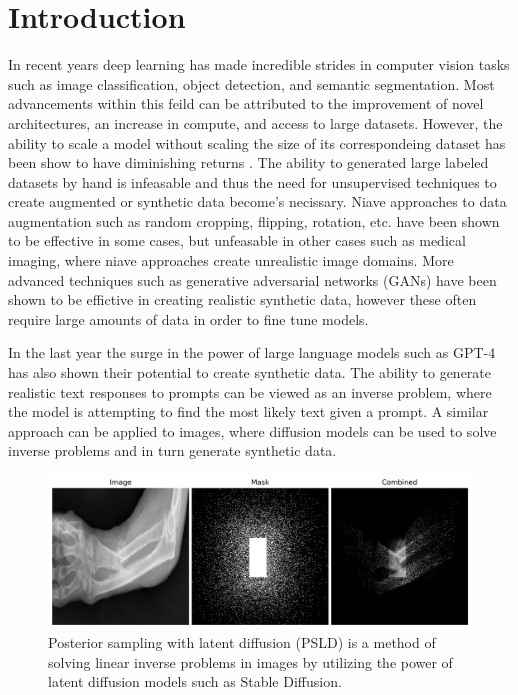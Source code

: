 \documentclass{article}
\begin{document}
\section{Introduction}
\label{introdcution}

In recent years deep learning has made incredible strides in computer vision tasks such as image classification,
object detection, and semantic segmentation. Most advancements within this feild can be attributed to the improvement
of novel architectures, an increase in compute, and access to large datasets. However, the ability to scale a model
without scaling the size of its correspondeing dataset has been show to have diminishing returns \cite{2001.08361}.
The ability to generated large labeled datasets by hand is infeasable and thus the need for unsupervised techniques to create
augmented or synthetic data become's necissary. Niave approaches to data augmentation such as random cropping, flipping,
rotation, etc. have been shown to be effective in some cases, but unfeasable in other cases such as medical imaging, where
niave approaches create unrealistic image domains. More advanced techniques such as generative adversarial networks (GANs)
have been shown to be effictive in creating realistic synthetic data, however these often require large amounts of data in
order to fine tune models.

In the last year the surge in the power of large language models such as GPT-4 has also shown their potential to create synthetic
data. The ability to generate realistic text responses to prompts can be viewed as an inverse problem, where the model is attempting
to find the most likely text given a prompt. A similar approach can be applied to images, where diffusion models can be used to solve
inverse problems and in turn generate synthetic data.

\begin{figure}[ht]
    \vskip 0.2in
    \begin{center}
        \centerline{\includegraphics[width=\columnwidth]{Mask.png}}
        \caption{Posterior sampling with latent diffusion (PSLD) is a method of solving linear inverse problems in images by utilizing the power of latent diffusion models such as Stable Diffusion.}
        \label{psld}
    \end{center}
    \vskip -0.3in
\end{figure}
\end{document}
